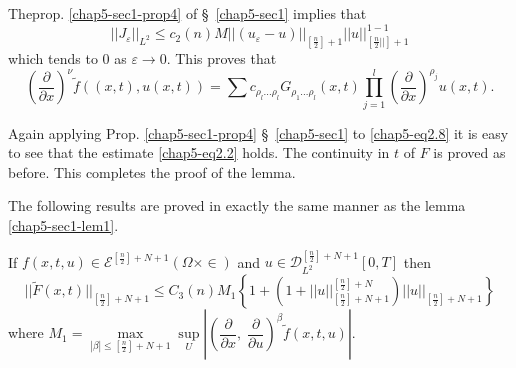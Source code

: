 The\pageoriginale  prop. \ref{chap5-sec1-prop4} of \S\ \ref{chap5-sec1}
implies that 
\begin{equation}
|| J_\varepsilon ||_{L^2} \leq c_2 (n) M || (u_\varepsilon - u)
||_{\left[\frac{n}{2} \right]+1} || u ||^{1-1}_{\left[\frac{n}{2}
||\right]+1} \tag{2.7}\label{chap5-eq2.7}  
\end{equation}
which tends to 0 as $\varepsilon \to 0$. This proves that
\begin{equation*}
\left(\frac{\partial}{\partial x}\right)^\nu \tilde{f} ((x, t), u(x, t)) = \sum
  c_{\rho_l \ldots \rho_l} G_{\rho_1 \ldots \rho_l}(x, t)
  \prod\limits^l_{j=1} \left(\frac{\partial}{\partial x}\right)^{\rho_j} u(x,
  t). \tag{2.8}\label{chap5-eq2.8} 
\end{equation*}

Again applying Prop. \ref{chap5-sec1-prop4} \S\ \ref{chap5-sec1} to
\eqref{chap5-eq2.8} it is easy to see that the 
estimate \eqref{chap5-eq2.2} holds. The continuity in $t$ of $F$ is proved as
before. This completes the proof of the lemma. 

The following results are proved in exactly the same manner as the
lemma \ref{chap5-sec1-lem1}. 

\setcounter{corollary}{0}
\begin{corollary}\label{chap5-sec2-coro1}%
If $f(x, t, u) \in
\mathscr{E}^{\left[\frac{n}{2}\right]+N+1}(\Omega \times 
  \in )$ and $ u \in
  \mathscr{D}^{\left[\frac{n}{2}\right]+N+1}_{L^2}[0, T]$ 
then 
\begin{equation*}
|| \tilde{F} (x, t) ||_{\left[\frac{n}{2}\right] + N + 1} \leq C_3 (n) M_1
\left\{ 1+ (1+ || u
||^{\left[\frac{n}{2}\right]+N}_{\left[\frac{n}{2}\right]+N+1}) || u
||_{\left[\frac{n}{2}\right]+N+1} \right\} \tag{2.9}\label{chap5-eq2.9}  
\end{equation*}
where $M_1 = \max\limits_{| \beta | \leq \left[\frac{n}{2}\right] + N
  + 1} \sup\limits_U \left| \left(\dfrac{\partial}{\partial x},  \;
\dfrac{\partial}{\partial u}\right)^\beta \tilde{f}(x, t, u) \right|$. 
\end{corollary}

